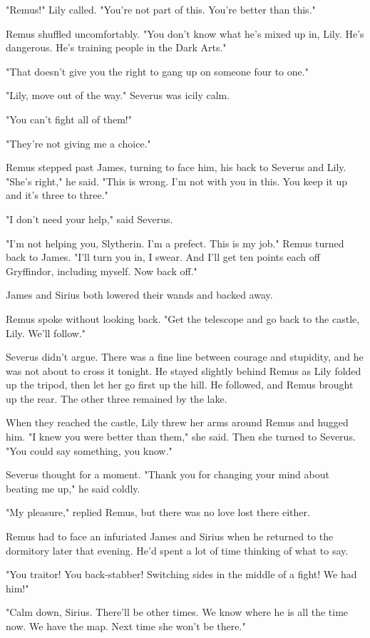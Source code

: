 \documentclass[a4paper,11pt]{article}
\begin{document}
"Remus!" Lily called. "You're not part of this. You're better than this."

Remus shuffled uncomfortably. "You don't know what he's mixed up in, Lily. He's dangerous. He's training people in the Dark Arts."

"That doesn't give you the right to gang up on someone four to one."

"Lily, move out of the way." Severus was icily calm.

"You can't fight all of them!"

"They're not giving me a choice."

Remus stepped past James, turning to face him, his back to Severus and Lily. "She's right," he said. "This is wrong. I'm not with you in this. You keep it up and it's three to three."

"I don't need your help," said Severus.

"I'm not helping you, Slytherin. I'm a prefect. This is my job." Remus turned back to James. "I'll turn you in, I swear. And I'll get ten points each off Gryffindor, including myself. Now back off."

James and Sirius both lowered their wands and backed away.

Remus spoke without looking back. "Get the telescope and go back to the castle, Lily. We'll follow."

Severus didn't argue. There was a fine line between courage and stupidity, and he was not about to cross it tonight. He stayed slightly behind Remus as Lily folded up the tripod, then let her go first up the hill. He followed, and Remus brought up the rear. The other three remained by the lake.

When they reached the castle, Lily threw her arms around Remus and hugged him. "I knew you were better than them," she said. Then she turned to Severus. "You could say something, you know."

Severus thought for a moment. "Thank you for changing your mind about beating me up," he said coldly.

"My pleasure," replied Remus, but there was no love lost there either.

Remus had to face an infuriated James and Sirius when he returned to the dormitory later that evening. He'd spent a lot of time thinking of what to say.

"You traitor! You back-stabber! Switching sides in the middle of a fight! We had him!"

"Calm down, Sirius. There'll be other times. We know where he is all the time now. We have the map. Next time she won't be there."
\end{document}
